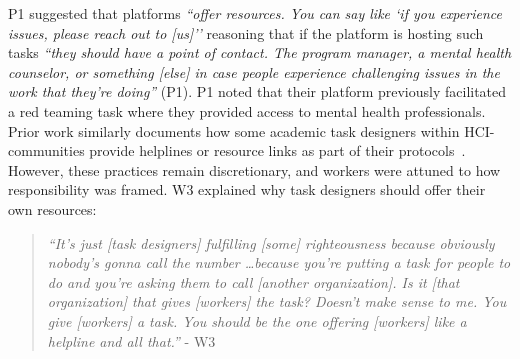 P1 suggested that platforms \textit{``offer resources. You can say like `if you experience issues, please reach out to [us]''} reasoning that if the platform is hosting such tasks \textit{``they should have a point of contact. The program manager, a mental health counselor, or something [else] in case people experience challenging issues in the work that they're doing''} (P1). P1 noted that their platform previously facilitated a red teaming task where they provided access to mental health professionals. Prior work similarly documents how some academic task designers within HCI-communities provide helplines or resource links as part of their protocols~\cite{qian2025locating, Zhang2024PerceptionsTriggerWarnings}. However, these practices remain discretionary, and workers were attuned to how responsibility was framed. W3 explained why task designers should offer their own resources:
\begin{quote}
    \textit{``It's just [task designers] fulfilling [some] righteousness because obviously nobody's gonna call the number \dots because you're putting a task for people to do and you're asking them to call [another organization]. Is it [that organization] that gives [workers] the task? Doesn't make sense to me. You give [workers] a task. You should be the one offering [workers] like a helpline and all that.''} - W3
\end{quote}
